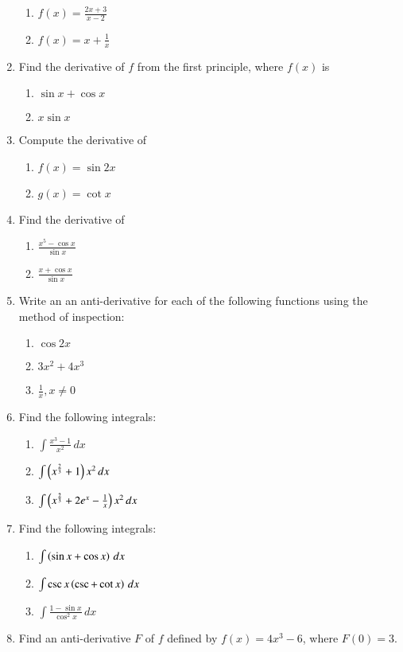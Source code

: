\begin{enumerate}[label=\arabic*.,ref=\thesubsection.\theenumi]
\begin{enumerate}
\item  $f(x) = \frac{2x+3}{x-2}$
\item  $f(x) = x + \frac{1}{x}$
\end{enumerate}
%
\item Find the derivative of $f$ from the first principle, where $f(x)$ is 
%
\begin{enumerate}
\item  $\sin x + \cos x$
\item  $x \sin x$
\end{enumerate}
%
\item Compute the derivative of 
%
\begin{enumerate}
\item  $f(x) = \sin 2x$
\item  $g(x) = \cot x$
\end{enumerate}
%
\item Find the derivative of 
%
\begin{enumerate}
\item  $\frac{x^5-\cos x}{\sin x}$
\item  $\frac{x+\cos x}{\sin x}$
\end{enumerate}
%
\item Write an an anti-derivative for each of the following functions using the method of inspection:
\begin{enumerate}
%
\item  $\cos 2x$
\item  $3x^2+4x^3$
\item  $\frac{1}{x}, x \ne 0$
%
\end{enumerate}
\item Find the following integrals:
\begin{enumerate}
%
\item  $\int \frac{x^3-1}{x^2}\, dx$
\item  $\int \left(x^{\frac{2}{3}}+1\right){x^2}\, dx$
\item  $\int \left(x^{\frac{2}{3}}+2e^x - \frac{1}{x}\right){x^2}\, dx$
\end{enumerate}
%
\item Find the following integrals:
\begin{enumerate}
%
\item  $\int \left(\sin x + \cos x\right) \, dx$
\item  $\int \csc x\left(\csc  + \cot x\right) \, dx$
\item  $\int \frac{1-\sin x}{ \cos^2 x} \, dx$
%
\end{enumerate}
%
\item Find an anti-derivative $F$ of $f$ defined by $f(x) = 4x^3-6$, where $F(0) = 3$.

\end{enumerate}
